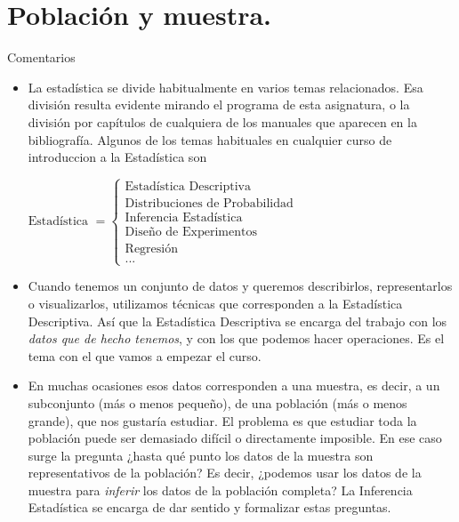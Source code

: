 \section{Población y muestra.}
Comentarios
\begin{itemize}
    \item La estadística se divide habitualmente en varios temas relacionados. Esa división resulta evidente mirando el programa de esta asignatura, o la división por capítulos de cualquiera de los manuales que aparecen en la bibliografía. Algunos de los temas habituales en cualquier curso de introduccion a la Estadística son
        \begin{center}
        $
        \mbox{Estadística }=\begin{cases}
        \mbox{Estadística Descriptiva}\\
        \mbox{Distribuciones de Probabilidad}\\
        \mbox{Inferencia Estadística}\\
        \mbox{Diseño de Experimentos}\\
        \mbox{Regresión}\\
        \mbox{...}
        \end{cases}
        $
        \end{center}

    \item Cuando tenemos un conjunto de datos y queremos describirlos, representarlos o  visualizarlos, utilizamos técnicas que corresponden a la {\sf Estadística Descriptiva}. Así que la Estadística Descriptiva se encarga del trabajo con los {\em datos que de hecho tenemos}, y con los que podemos hacer operaciones. Es el tema con el que vamos a empezar el curso.

    \item En muchas ocasiones esos datos corresponden a una {\sf muestra}, es decir, a un subconjunto (más o menos pequeño), de una {\sf población} (más o menos grande), que nos gustaría estudiar. El problema es que estudiar toda la población puede ser demasiado difícil o directamente imposible. En ese caso surge la pregunta ¿hasta qué punto los datos de la muestra son representativos de la población? Es decir, ¿podemos usar los datos de la muestra para {\em inferir} los datos de la población completa? La {\sf Inferencia Estadística} se encarga de dar sentido y formalizar estas preguntas.


\end{itemize}
